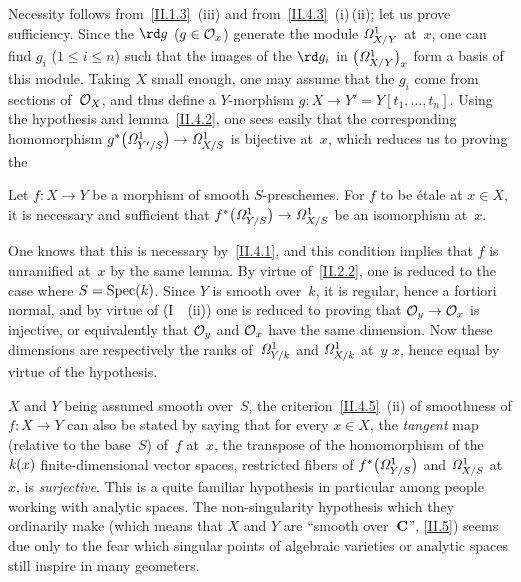 Necessity follows from~\ref{II.1.3}~(iii) and
from~\ref{II.4.3}~(i)\,(ii); let us prove sufficiency. Since the
$\rd g$ ($g\in\cal{O}_{x}$) generate the module
$\it{\Omega}^1_{X/Y}$ at~$x$, one can find
$g_{i}$ ($1\le i\le n$) such that the images of the $\rd g_{i}$ in
$\big(\it{\Omega}^1_{X/Y}\big)_{x}$ form a basis of this
module. Taking $X$ small enough, one may assume that the $g_{i}$
come from sections of~$\cal{O}_{X}$, and thus define a
$Y$-morphism $g\colon X\to Y'=Y[t_{1},\dots,t_{n}]$. Using
the hypothesis and lemma~\ref{II.4.2}, one sees easily that
the corresponding homomorphism
$g^*\big(\it{\Omega}^1_{Y'/S}\big)\to\it{\Omega}^1_{X/S}$ is
bijective at~$x$, which reduces us to proving the

\begin{corollary}
\label{II.4.6}
Let $f\colon X\to Y$ be a morphism of smooth $S$-preschemes.
For $f$ to be \'etale at $x\in X$, it is necessary and sufficient
that $f^*\big(\it{\Omega}^1_{Y/S}\big)\to\it{\Omega}^1_{X/S}$ be
an isomorphism at~$x$.
\end{corollary}

One knows that this is necessary by~\ref{II.4.1}, and this condition
implies that $f$ is unramified at~$x$ by the same lemma. By virtue
of~\ref{II.2.2}, one is reduced to the case where
$S=\Spec(k)$. Since $Y$ is smooth over~$k$, it is regular, hence a
fortiori normal, and by virtue of (I~~(ii)) one is reduced
to proving that $\cal{O}_{y}\to\cal{O}_{x}$ is injective, or equivalently
that $\cal{O}_{y}$ and $\cal{O}_{x}$ have the same dimension. Now these
dimensions are respectively the ranks of~$\it{\Omega}^1_{Y/k}$ and
$\it{\Omega}^1_{X/k}$ at~$y$ \resp $x$, hence equal by virtue of
the hypothesis.
\begin{remarks}
\label{II.4.7}
$X$ and $Y$ being assumed smooth over~$S$, the
criterion~\ref{II.4.5}~(ii) of smoothness of $f\colon X\to Y$ can
also be stated by saying that for every $x\in X$, the
\emph{tangent} map (relative to the base~$S$) of~$f$ at~$x$,
\ie the transpose of the homomorphism of the $\kres(x)$ finite-dimensional vector spaces,
restricted fibers of
$f^*\big(\it{\Omega}^1_{Y/S}\big)$ and $\it{\Omega}^1_{X/S}$ at
$x$, is \emph{surjective}. This is a quite
familiar hypothesis in particular among people working with
analytic spaces. The non-singularity hypothesis which they
ordinarily make (which means that $X$ and $Y$ are ``smooth over~$\CC$'', \cf \No\ref{II.5}) seems due only to the fear which
singular points of algebraic varieties or analytic spaces still inspire
in many geometers.
\end{remarks}


